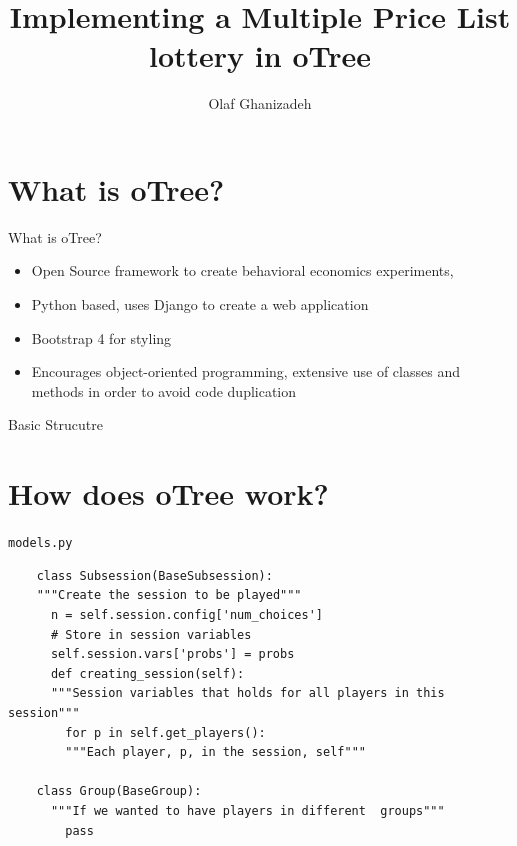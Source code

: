 \documentclass[10pt]{beamer}
\title{Implementing a \textcite{holt_risk_2002} Multiple Price List lottery in oTree}
\date{}
\author{Olaf Ghanizadeh}
\begin{document}
\maketitle

\section{What is oTree?}

\begin{frame}[fragile]{What is oTree?}

  \begin{itemize}
    \item Open Source framework to create behavioral economics experiments, \textcite{chen_otreeopen-source_2016}
    \item Python based, uses Django to create a web application
    \item Bootstrap 4 for styling
    \item Encourages object-oriented programming, extensive use of classes and methods in order to avoid code duplication
  \end{itemize}

\end{frame}

\begin{frame}{Basic Strucutre}
\end{frame}

\section{How does oTree work?}
\begin{frame}[fragile]{\texttt{models.py}}
  \begin{verbatim}
    class Subsession(BaseSubsession):
    """Create the session to be played"""
      n = self.session.config['num_choices']
      # Store in session variables
      self.session.vars['probs'] = probs
      def creating_session(self):
      """Session variables that holds for all players in this session"""
        for p in self.get_players():
        """Each player, p, in the session, self"""
    
    class Group(BaseGroup):
      """If we wanted to have players in different  groups"""
        pass
  \end{verbatim}
\end{frame}
\end{document}
